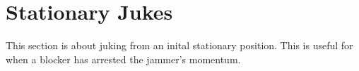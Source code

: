 \section{Stationary Jukes}

This section is about juking from an inital stationary position.
This is useful for when a blocker has arrested the jammer's momentum.



